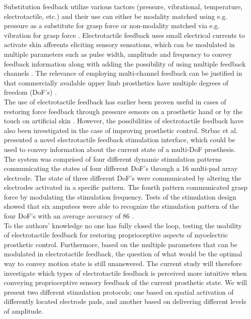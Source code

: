 Substitution feedback utilize various tactors (pressure, vibrational, temperature, electrotactile, etc.) and their use can either be modality matched using e.g. pressure as a substitute for grasp force \cite{Godfrey2017} or non-modality matched via e.g. vibration for grasp force \cite{Ninu2014,Nabeel2016}. 
Electrotactile feedback uses small electrical currents to activate skin afferents eliciting sensory sensations, which can be modulated in multiple parameters such as pulse width, amplitude and frequency to convey feedback information along with adding the possibility of using multiple feedback channels \cite{Geng2012}. The relevance of employing multi-channel feedback can be justified in that commercially available upper limb prosthetics have multiple degrees of freedom (DoF's) \cite{Cordella2016}. \\
%
The use of electrotactile feedback has earlier been proven useful in cases of restoring force feedback through pressure sensors on a prosthetic hand or by the touch on artificial skin \cite{Hartmann2014,Franceschi2015}. However, the possibilities of electrotactile feedback have also been investigated in the case of improving prosthetic control. Strbac et al. \cite{Strbac2016} presented a novel electrotactile feedback stimulation interface, which could be used to convey information about the current state of a multi-DoF prosthesis. The system was comprised of four different dynamic stimulation patterns communicating the states of four different DoF's through a 16 multi-pad array electrode. The state of three different DoF's were communicated by altering the electrodes activated in a specific pattern. The fourth pattern communicated grasp force by modulating the stimulation frequency. Tests of the stimulation design showed that six amputees were able to recognize the stimulation pattern of the four DoF's with an average accuracy of 86 \percent. \cite{Strbac2016} \\   
%
To the authors' knowledge no one has fully closed the loop, testing the usability of electrotactile feedback for restoring proprioceptive aspects of myoelectric prosthetic control. Furthermore, based on the multiple parameters that can be modulated in electrotactile feedback, the question of what would be the optimal way to convey motion state is still unanswered. The current study will therefore investigate which types of electrotactile feedback is perceived more intuitive when conveying proprioceptive sensory feedback of the current prosthetic state. We will present two different stimulation protocols; one based on spatial activation of differently located electrode pads, and another based on delivering different levels of amplitude.      


 
